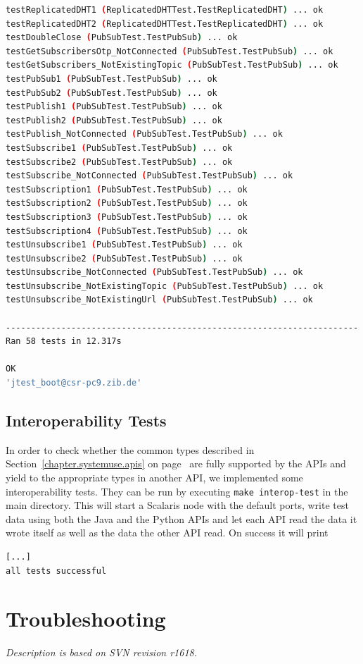 \documentclass[a4paper]{scrreprt}
\newcommand{\sieheref}[1]{\ref{#1} on page~\pageref{#1}}
\newcommand{\code}[1]{\lstinline[basicstyle=\ttfamily]!#1!}
\newcommand{\svnrev}[1]
{\hfill\emph{Description is based on SVN revision #1.}\medskip}
\begin{document}
\begin{lstlisting}[language=sh]
testReplicatedDHT1 (ReplicatedDHTTest.TestReplicatedDHT) ... ok
testReplicatedDHT2 (ReplicatedDHTTest.TestReplicatedDHT) ... ok
testDoubleClose (PubSubTest.TestPubSub) ... ok
testGetSubscribersOtp_NotConnected (PubSubTest.TestPubSub) ... ok
testGetSubscribers_NotExistingTopic (PubSubTest.TestPubSub) ... ok
testPubSub1 (PubSubTest.TestPubSub) ... ok
testPubSub2 (PubSubTest.TestPubSub) ... ok
testPublish1 (PubSubTest.TestPubSub) ... ok
testPublish2 (PubSubTest.TestPubSub) ... ok
testPublish_NotConnected (PubSubTest.TestPubSub) ... ok
testSubscribe1 (PubSubTest.TestPubSub) ... ok
testSubscribe2 (PubSubTest.TestPubSub) ... ok
testSubscribe_NotConnected (PubSubTest.TestPubSub) ... ok
testSubscription1 (PubSubTest.TestPubSub) ... ok
testSubscription2 (PubSubTest.TestPubSub) ... ok
testSubscription3 (PubSubTest.TestPubSub) ... ok
testSubscription4 (PubSubTest.TestPubSub) ... ok
testUnsubscribe1 (PubSubTest.TestPubSub) ... ok
testUnsubscribe2 (PubSubTest.TestPubSub) ... ok
testUnsubscribe_NotConnected (PubSubTest.TestPubSub) ... ok
testUnsubscribe_NotExistingTopic (PubSubTest.TestPubSub) ... ok
testUnsubscribe_NotExistingUrl (PubSubTest.TestPubSub) ... ok

----------------------------------------------------------------------
Ran 58 tests in 12.317s

OK
'jtest_boot@csr-pc9.zib.de'
\end{lstlisting}

\section{Interoperability Tests}
In order to check whether the common types described in
Section~\sieheref{chapter.systemuse.apis} are fully supported by the APIs
and yield to the appropriate types in another API, we implemented some
interoperability tests. They can be run by executing \code{make interop-test}
in the main directory.
This will start a Scalaris node with the default ports, write test data using
both the Java and the Python APIs and let each API read the data it wrote
itself as well as the data the other API read. On success it will print

\begin{lstlisting}[language=sh]
%> make interop-test
[...]
all tests successful
\end{lstlisting}

\chapter{Troubleshooting}
\svnrev{r1618}
\end{document}

